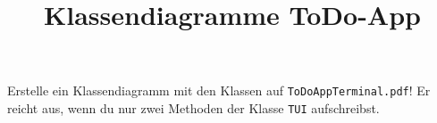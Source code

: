 \documentclass[a4paper,DIV =14]{scrartcl}
\date{}
\title{Klassendiagramme ToDo-App}
\begin{document}
\begin{aufgabe}
Erstelle ein Klassendiagramm mit den Klassen auf \texttt{ToDoAppTerminal.pdf}! Er reicht aus, wenn du nur zwei Methoden der Klasse \texttt{TUI} aufschreibst.
\end{aufgabe}
\end{document}
